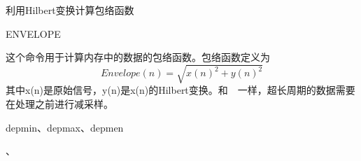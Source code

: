 \label{cmd:envelope}

利用Hilbert变换计算包络函数

\begin{SACSTX}
ENVELOPE
\end{SACSTX}

这个命令用于计算内存中的数据的包络函数。包络函数定义为
	\[ Envelope(n)= \sqrt{x(n)^2+y(n)^2} \]
其中x(n)是原始信号，y(n)是x(n)的Hilbert变换。和~~一样，超长周期的数据需要在处理之前进行减采样。

depmin、depmax、depmen

、

